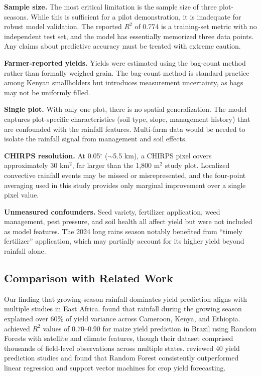 \documentclass[11pt,a4paper]{article}
\begin{document}
\textbf{Sample size.} The most critical limitation is the sample size of three plot-seasons. While this is sufficient for a pilot demonstration, it is inadequate for robust model validation. The reported $R^2$ of 0.774 is a training-set metric with no independent test set, and the model has essentially memorized three data points. Any claims about predictive accuracy must be treated with extreme caution.

\textbf{Farmer-reported yields.} Yields were estimated using the bag-count method rather than formally weighed grain. The bag-count method is standard practice among Kenyan smallholders but introduces measurement uncertainty, as bags may not be uniformly filled.

\textbf{Single plot.} With only one plot, there is no spatial generalization. The model captures plot-specific characteristics (soil type, slope, management history) that are confounded with the rainfall features. Multi-farm data would be needed to isolate the rainfall signal from management and soil effects.

\textbf{CHIRPS resolution.} At 0.05$^\circ$ ($\sim$5.5 km), a CHIRPS pixel covers approximately 30 km$^2$, far larger than the 1,800 m$^2$ study plot. Localized convective rainfall events may be missed or misrepresented, and the four-point averaging used in this study provides only marginal improvement over a single pixel value.

\textbf{Unmeasured confounders.} Seed variety, fertilizer application, weed management, pest pressure, and soil health all affect yield but were not included as model features. The 2024 long rains season notably benefited from ``timely fertilizer'' application, which may partially account for its higher yield beyond rainfall alone.

\subsection{Comparison with Related Work}

Our finding that growing-season rainfall dominates yield prediction aligns with multiple studies in East Africa. \cite{molua2009} found that rainfall during the growing season explained over 60\% of yield variance across Cameroon, Kenya, and Ethiopia. \cite{schwalbert2020} achieved $R^2$ values of 0.70--0.90 for maize yield prediction in Brazil using Random Forests with satellite and climate features, though their dataset comprised thousands of field-level observations across multiple states. \cite{jeong2016} reviewed 40 yield prediction studies and found that Random Forest consistently outperformed linear regression and support vector machines for crop yield forecasting.
\end{document}
